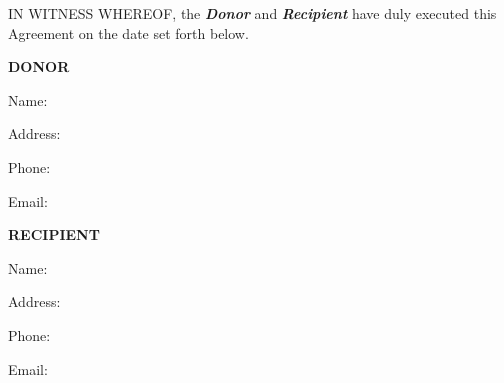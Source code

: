 
IN WITNESS WHEREOF, the \textbf{\textit{Donor}} and \textbf{\textit{Recipient}} have duly executed this Agreement on the date set forth below.


\vspace{0.5in}

\hspace{3in}
\textbf{DONOR}

\vspace{0.2in}
\hspace{3in}
Name: \DonorName{}

\vspace{0.2in}

\hspace{3in}
\parbox{3.5in}{
Address: \DonorAddress{}
}
\vspace{0.2in}

\hspace{3in}
Phone: \DonorPhone{}

\vspace{0.2in}

\hspace{3in}
Email: \DonorEmail{}


\vspace{0.5in}

\hspace{3in}
\textbf{RECIPIENT}

\vspace{0.2in}
\hspace{3in}
Name: \RecipientName{}

\vspace{0.2in}

\hspace{3in}
\parbox{3.5in}{
Address: \RecipientAddress{}
}
\vspace{0.2in}

\hspace{3in}
Phone: \RecipientPhone{}

\vspace{0.2in}

\hspace{3in}
Email: \RecipientEmail{}

